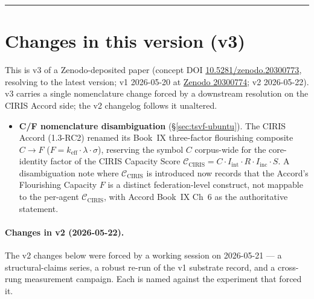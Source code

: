 \documentclass[11pt,a4paper]{article}
\newcommand{\keff}{k_{\text{eff}}}
\begin{document}
\vspace{0.5em}
\hrule
\vspace{0.5em}

\section*{Changes in this version (v3)}

This is v3 of a Zenodo-deposited paper (concept DOI \href{https://doi.org/10.5281/zenodo.20300773}{10.5281/zenodo.20300773}, resolving to the latest version; v1 2026-05-20 at \href{https://zenodo.org/records/20300774}{Zenodo 20300774}; v2 2026-05-22). v3 carries a single nomenclature change forced by a downstream resolution on the CIRIS Accord side; the v2 changelog follows it unaltered.

\begin{itemize}[leftmargin=*,itemsep=0.5em]
\item \textbf{C/F nomenclature disambiguation} (\S\ref{sec:tsvf-ubuntu}). The CIRIS Accord (1.3-RC2) renamed its Book~IX three-factor flourishing composite $C \to F$ ($F = \keff \cdot \lambda \cdot \sigma$), reserving the symbol $C$ corpus-wide for the core-identity factor of the CIRIS Capacity Score $\mathcal{C}_{\text{CIRIS}} = C \cdot I_{\text{int}} \cdot R \cdot I_{\text{inc}} \cdot S$. A disambiguation note where $\mathcal{C}_{\text{CIRIS}}$ is introduced now records that the Accord's Flourishing Capacity $F$ is a distinct federation-level construct, not mappable to the per-agent $\mathcal{C}_{\text{CIRIS}}$, with Accord Book~IX Ch~6 as the authoritative statement.
\end{itemize}

\paragraph{Changes in v2 (2026-05-22).} The v2 changes below were forced by a working session on 2026-05-21 --- a structural-claims series, a robust re-run of the v1 substrate record, and a cross-rung measurement campaign. Each is named against the experiment that forced it.
\end{document}
